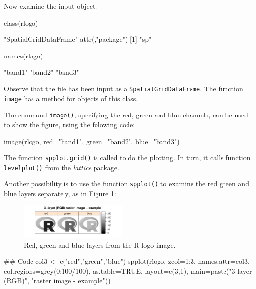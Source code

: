 \documentclass{tufte-book}\usepackage[]{graphicx}\usepackage[]{color}
\newcommand{\txtt}[1]{\texttt{#1}}
\begin{document}
Now examine the input object:
\begin{Schunk}
\begin{Sinput}
class(rlogo)
\end{Sinput}
\begin{Soutput}
[1] "SpatialGridDataFrame"
attr(,"package")
[1] "sp"
\end{Soutput}
\begin{Sinput}
names(rlogo)
\end{Sinput}
\begin{Soutput}
[1] "band1" "band2" "band3"
\end{Soutput}
\end{Schunk}
\noindent
Observe that the file has been input as a \txtt{SpatialGridDataFrame}. The
function \txtt{image} has a method for objects of this class.

The command \txtt{image()}, specifying the red, green and blue channels,
can be used to show the figure, using the folowing code:

\begin{Schunk}
\begin{Sinput}
image(rlogo, red="band1",
      green="band2",
      blue="band3")
\end{Sinput}
\end{Schunk}
\noindent
The function \txtt{spplot.grid()} is called to do the plotting.
In turn, it calls function \txtt{levelplot()} from the
{\em lattice} package.

Another possibility is to use the function \texttt{spplot()}
  to examine the red green and blue layers separately, as in Figure
  \ref{fig:rlogo3}:
\begin{figure}
\begin{Schunk}


\centerline{\includegraphics[width=0.47\textwidth]{figs/13-spplot-col3-1} }

\end{Schunk}
\caption{Red, green and blue layers from the R logo image.\label{fig:rlogo3}}
\end{figure}
\begin{Schunk}
\begin{Sinput}
## Code
col3 <- c("red","green","blue")
spplot(rlogo, zcol=1:3, names.attr=col3,
       col.regions=grey(0:100/100), as.table=TRUE,
       layout=c(3,1), main=paste("3-layer (RGB)",
       "raster image - example"))
\end{Sinput}
\end{Schunk}
\end{document}
